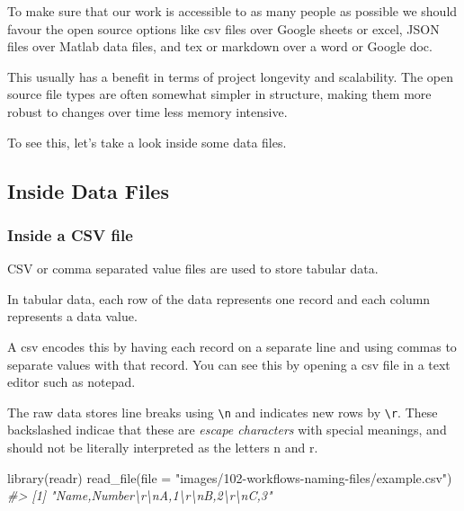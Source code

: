 \documentclass[
  12pt,
]{book}
\newenvironment{Shaded}{\begin{snugshade}}{\end{snugshade}}
\newcommand{\AttributeTok}[1]{\textcolor[rgb]{0.77,0.63,0.00}{#1}}
\newcommand{\CommentTok}[1]{\textcolor[rgb]{0.56,0.35,0.01}{\textit{#1}}}
\newcommand{\FunctionTok}[1]{\textcolor[rgb]{0.00,0.00,0.00}{#1}}
\newcommand{\NormalTok}[1]{#1}
\newcommand{\StringTok}[1]{\textcolor[rgb]{0.31,0.60,0.02}{#1}}
\begin{document}
To make sure that our work is accessible to as many people as possible we should favour the open source options like csv files over Google sheets or excel, JSON files over Matlab data files, and tex or markdown over a word or Google doc.

This usually has a benefit in terms of project longevity and scalability. The open source file types are often somewhat simpler in structure, making them more robust to changes over time less memory intensive.

To see this, let's take a look inside some data files.

\hypertarget{inside-data-files}{%
\subsection{Inside Data Files}\label{inside-data-files}}

\hypertarget{inside-a-csv-file}{%
\subsubsection{Inside a CSV file}\label{inside-a-csv-file}}

CSV or comma separated value files are used to store tabular data.

In tabular data, each row of the data represents one record and each column represents a data value.

A csv encodes this by having each record on a separate line and using commas to separate values with that record. You can see this by opening a csv file in a text editor such as notepad.

The raw data stores line breaks using \texttt{\textbackslash{}n} and indicates new rows by \texttt{\textbackslash{}r}. These backslashed indicae that these are \emph{escape characters} with special meanings, and should not be literally interpreted as the letters n and r.

\begin{Shaded}
\begin{Highlighting}[]
\FunctionTok{library}\NormalTok{(readr)}
\FunctionTok{read\_file}\NormalTok{(}\AttributeTok{file =} \StringTok{"images/102{-}workflows{-}naming{-}files/example.csv"}\NormalTok{)}
\CommentTok{\#\textgreater{} [1] "Name,Number\textbackslash{}r\textbackslash{}nA,1\textbackslash{}r\textbackslash{}nB,2\textbackslash{}r\textbackslash{}nC,3"}
\end{Highlighting}
\end{Shaded}
\end{document}
